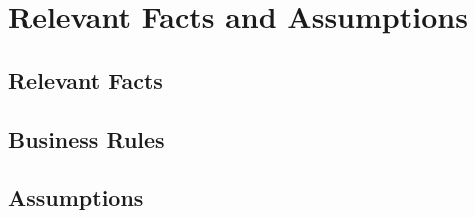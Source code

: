 \section{Relevant Facts and Assumptions}
\subsection{Relevant Facts}
\subsection{Business Rules}
\subsection{Assumptions}
